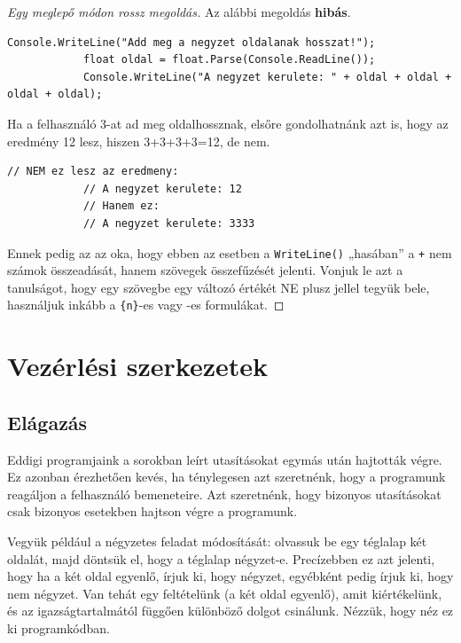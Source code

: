 \documentclass[a4paper]{article}
\begin{document}
	\begin{proof}[Egy meglepő módon rossz megoldás]
		Az alábbi megoldás \textbf{hibás}.
		
		\begin{lstlisting}[caption=Négyzet kerülete -- hibás megoldás, label=lst:slnSquareWrong]
			Console.WriteLine("Add meg a negyzet oldalanak hosszat!");
			float oldal = float.Parse(Console.ReadLine());
			Console.WriteLine("A negyzet kerulete: " + oldal + oldal + oldal + oldal);
		\end{lstlisting}
		
		Ha a felhasználó 3-at ad meg oldalhossznak, elsőre gondolhatnánk azt is, hogy az eredmény 12 lesz, hiszen 3+3+3+3=12, de nem.
		
		\begin{lstlisting}[caption=Négyzet kerülete -- hibás megoldás kimenete, label=lst:slnSquarewrongOutput]
			// NEM ez lesz az eredmeny:
			// A negyzet kerulete: 12
			// Hanem ez:
			// A negyzet kerulete: 3333
		\end{lstlisting}
		
		Ennek pedig az az oka, hogy ebben az esetben a \lstinline{WriteLine()} „hasában” a \lstinline{+} nem számok összeadását, hanem szövegek összefűzését jelenti. Vonjuk le azt a tanulságot, hogy egy szövegbe egy változó értékét NE plusz jellel tegyük bele, használjuk inkább a \lstinline!{n}!-es vagy \within{\lstinline{\$\{\}}}-es formulákat.
	\end{proof}
	
	\section{Vezérlési szerkezetek}
	\subsection{Elágazás}
	Eddigi programjaink a sorokban leírt utasításokat egymás után hajtották végre. Ez azonban érezhetően kevés, ha ténylegesen azt szeretnénk, hogy a programunk reagáljon a felhasználó bemeneteire. Azt szeretnénk, hogy bizonyos utasításokat csak bizonyos esetekben hajtson végre a programunk.
	
	Vegyük például a négyzetes feladat módosítását: olvassuk be egy téglalap két oldalát, majd döntsük el, hogy a téglalap négyzet-e. Precízebben ez azt jelenti, hogy ha a két oldal egyenlő, írjuk ki, hogy négyzet, egyébként pedig írjuk ki, hogy nem négyzet. Van tehát egy feltételünk (a két oldal egyenlő), amit kiértékelünk, és az igazságtartalmától függően különböző dolgot csinálunk. Nézzük, hogy néz ez ki programkódban.
	
\end{document}
